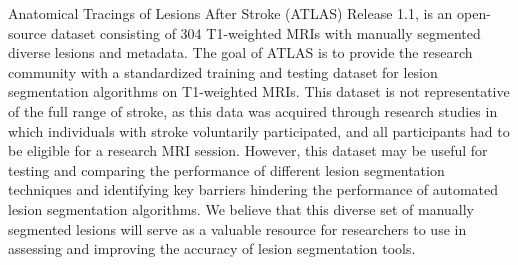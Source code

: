         Anatomical Tracings of Lesions After Stroke (ATLAS) Release 1.1, is an open-source dataset consisting of 304 T1-weighted MRIs with manually segmented diverse lesions and metadata. The goal of ATLAS is to provide the research community with a standardized training and testing dataset for lesion segmentation algorithms on T1-weighted MRIs. This dataset is not representative of the full range of stroke, as this data was acquired through research studies in which individuals with stroke voluntarily participated, and all participants had to be eligible for a research MRI session. However, this dataset may be useful for testing and comparing the performance of different lesion segmentation techniques and identifying key barriers hindering the performance of automated lesion segmentation algorithms. We believe that this diverse set of manually segmented lesions will serve as a valuable resource for researchers to use in assessing and improving the accuracy of lesion segmentation tools.
